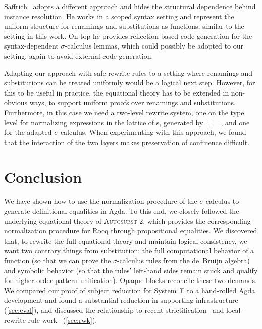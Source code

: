 \documentclass[a4paper,UKenglish,cleveref, autoref, thm-restate,anonymous]{lipics-v2021}
\begin{document}
Saffrich~\cite{saffrich:LIPIcs.ITP.2024.32} adopts a different approach and
hides the structural dependence behind instance resolution. He works in a
scoped syntax setting and represent the uniform structure for renamings and
substitutions as functions, similar to the setting in this work. On top he
provides reflection-based code generation for the syntax-dependent $σ$-calculus
lemmas, which could possibly be adopted to our setting, again to avoid external code
generation.

Adapting our approach with safe rewrite rules to a setting where renamings and
substitutions can be treated uniformly would be a logical next step. However,
for this to be useful in practice, the equational theory has to be extended in
non-obvious ways, to support uniform proofs over renamings and substitutions.
Furthermore, in this case we need a two-level rewrite system, one on the type
level for normalizing expressions in the lattice of s,
generated by  $\sqsubseteq$
~\cite{altenkirch2025substitution}, and one for the
adapted $σ$-calculus. When experimenting with this approach, we found that the
interaction of the two layers makes preservation of confluence difficult.

\section{Conclusion}\label{sec:con}
We have shown how to use the normalization procedure of the $σ$-calculus to
generate definitional equalities in Agda. To this end, we closely followed
the underlying equational theory of \textsc{Autosubst 2}, which provides the
corresponding normalization procedure for Rocq through propositional
equalities. We discovered that, to rewrite the full equational theory and
maintain logical consistency, we want two contrary things from substitution:
the full computational behavior of a function (so that we can prove the
$σ$-calculus rules from the de~Bruijn algebra) and symbolic behavior (so that
the rules' left-hand sides remain stuck and qualify for higher-order pattern
unification). Opaque blocks reconcile these two demands. We compared our
proof of subject reduction for System~F to a hand-rolled Agda development and
found a substantial reduction in supporting infrastructure
(\cref{sec:eval}), and discussed the relationship to recent
strictification~\cite{10.1145/3747535} and local-rewrite-rule
work~\cite{10.1145/3776704} (\cref{sec:rwk}).


\end{document}
